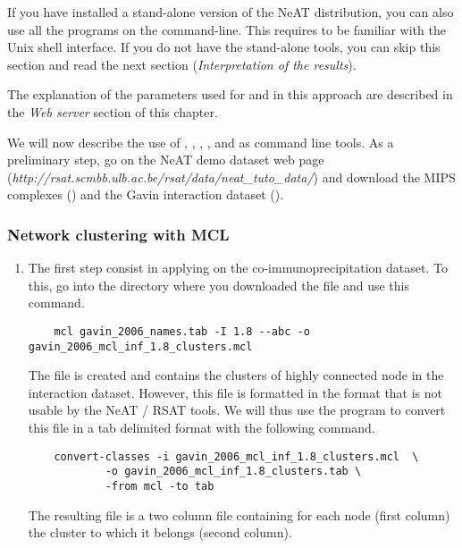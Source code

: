 If you have installed a stand-alone version of the NeAT distribution,
you can also use all the programs on the 
command-line. This requires to be familiar with the Unix shell
interface. If you do not have the stand-alone tools, you can skip this
section and read the next section (\textit{Interpretation of the results}).

The explanation of the parameters used for  and  in this approach are described in the \textit{Web server} section of this chapter.

We will now describe the use of , , , ,   and  as command line tools. 
As a preliminary step, go on the NeAT demo dataset web page (\textit{http://rsat.scmbb.ulb.ac.be/rsat/data/neat\_tuto\_data/}) and download the MIPS complexes () and the Gavin interaction dataset ().



\subsubsection{Network clustering with MCL}
\begin{enumerate}
\item The first step consist in applying  on the co-immunoprecipitation dataset. 
To this, go into the directory where you downloaded the file  and use this command. 
	
	{\color{Blue} \begin{footnotesize} 
		\begin{verbatim}
	mcl gavin_2006_names.tab -I 1.8 --abc -o gavin_2006_mcl_inf_1.8_clusters.mcl
		\end{verbatim} \end{footnotesize}
	}		
The file  is created and contains the clusters of highly connected node in the interaction dataset. However, this file is formatted in the  format that is not usable by the NeAT / RSAT tools. We will thus use the program  to convert this file in a tab delimited format with
the following command.


	{\color{Blue} \begin{footnotesize} 
		\begin{verbatim}
	convert-classes -i gavin_2006_mcl_inf_1.8_clusters.mcl  \
			-o gavin_2006_mcl_inf_1.8_clusters.tab \
			-from mcl -to tab
		\end{verbatim} \end{footnotesize}
	}
The resulting file is a two column file containing for each node (first column) the cluster to which it belongs (second column).
\end{enumerate}
